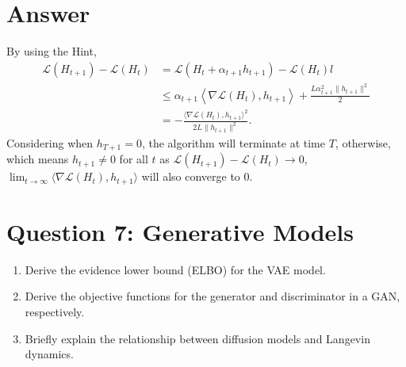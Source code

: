 \documentclass[
	12pt, %
]{fphw}
\begin{document}
\section*{Answer}
By using the Hint, 
\begin{equation*}
	\begin{aligned}
		\mathcal{L}(H_{t+1})-\mathcal{L}(H_{t})& =\mathcal{L}(H_{t}+\alpha_{t+1}h_{t+1})-\mathcal{L}(H_{t})l  \\
		&\leq\alpha_{t+1}\left<\nabla \mathcal{L}(H_{t}),h_{t+1}\right>+\frac{L\alpha _{t+1}^{2}\|h_{t+1}\|^{2}}{2} \\
		& = -\frac{\langle\nabla \mathcal{L}(H_{t}),h_{t+1}\rangle^{2}}{2L\|h_{t+1}\|^{2}}.
	\end{aligned}
\end{equation*}
Considering when $h_{T+1}=0$, the algorithm will terminate at time $T$, otherwise, which means $h_{t+1}\neq 0$ for all $t$
 as $\mathcal{L}(H_{t+1})-\mathcal{L}(H_{t}) \rightarrow 0$,  $\operatorname*{lim}_{t\to\infty}\langle\nabla\mathcal{L}(H_{t}),h_{t+1}\rangle$ will also converge to 0.
\section*{Question 7: Generative Models}

\begin{problem}
	\begin{enumerate}
	\item Derive the evidence lower bound (ELBO) for the VAE model. 

    \item Derive the objective functions for the generator and discriminator in a GAN, respectively. 
    

    \item Briefly explain the relationship between diffusion models and Langevin dynamics.  
\end{enumerate}
\end{problem}
\end{document}
